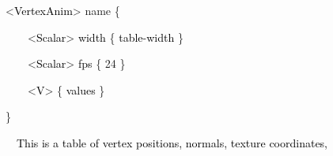 \documentclass[a4paper]{article}
\newcommand\textstyleOOoComputerKeyWord[1]{\textrm{\textcolor[rgb]{0.0,0.0,0.5019608}{#1}}}
\newcommand\textstyleOOoAssemblerSpecialChar[1]{\textrm{\textcolor[rgb]{0.0,0.5019608,0.0}{#1}}}
\newcommand\textstyleOOoAssemblerIdent[1]{\textrm{\textcolor{black}{#1}}}
\newcommand\textstyleOOoAssemblerDirective[1]{\textrm{\textcolor[rgb]{0.0,0.5019608,1.0}{#1}}}
\newcommand\textstyleOOoAssemblerLiteral[1]{\textrm{\textcolor[rgb]{0.49803922,0.0,0.49803922}{#1}}}
\begin{document}
\bigskip


\bigskip


\bigskip

{\color{black}
\textstyleOOoComputerKeyWord{\textcolor{black}{\ \ }}\textstyleOOoAssemblerSpecialChar{{\textless}}\textstyleOOoAssemblerIdent{VertexAnim}\textstyleOOoAssemblerSpecialChar{{\textgreater}}\textstyleOOoComputerKeyWord{\textcolor{black}{
}}\textstyleOOoAssemblerDirective{name}\textstyleOOoComputerKeyWord{\textcolor{black}{
}}\textstyleOOoAssemblerSpecialChar{\{}\textstyleOOoComputerKeyWord{\textcolor{black}{ }}}

{\color{black}
\textstyleOOoComputerKeyWord{\textcolor{black}{\ \ \ \ \ \ }}\textstyleOOoAssemblerSpecialChar{{\textless}}\textstyleOOoAssemblerIdent{Scalar}\textstyleOOoAssemblerSpecialChar{{\textgreater}}\textstyleOOoComputerKeyWord{\textcolor{black}{
}}\textstyleOOoAssemblerIdent{width}\textstyleOOoComputerKeyWord{\textcolor{black}{
}}\textstyleOOoAssemblerSpecialChar{\{}\textstyleOOoComputerKeyWord{\textcolor{black}{
}}\textstyleOOoAssemblerIdent{table}\textstyleOOoAssemblerSpecialChar{{}-}\textstyleOOoAssemblerIdent{width}\textstyleOOoComputerKeyWord{\textcolor{black}{
}}\textstyleOOoAssemblerSpecialChar{\}}}

{\color{black}
\textstyleOOoComputerKeyWord{\textcolor{black}{\ \ \ \ \ \ }}\textstyleOOoAssemblerSpecialChar{{\textless}}\textstyleOOoAssemblerIdent{Scalar}\textstyleOOoAssemblerSpecialChar{{\textgreater}}\textstyleOOoComputerKeyWord{\textcolor{black}{
}}\textstyleOOoAssemblerIdent{fps}\textstyleOOoComputerKeyWord{\textcolor{black}{
}}\textstyleOOoAssemblerSpecialChar{\{}\textstyleOOoComputerKeyWord{\textcolor{black}{
}}\textstyleOOoAssemblerLiteral{24}\textstyleOOoComputerKeyWord{\textcolor{black}{
}}\textstyleOOoAssemblerSpecialChar{\}}}

{\color{black}
\textstyleOOoComputerKeyWord{\textcolor{black}{\ \ \ \ \ \ }}\textstyleOOoAssemblerSpecialChar{{\textless}}\textstyleOOoAssemblerIdent{V}\textstyleOOoAssemblerSpecialChar{{\textgreater}}\textstyleOOoComputerKeyWord{\textcolor{black}{
}}\textstyleOOoAssemblerSpecialChar{\{}\textstyleOOoComputerKeyWord{\textcolor{black}{
}}\textstyleOOoAssemblerIdent{values}\textstyleOOoComputerKeyWord{\textcolor{black}{
}}\textstyleOOoAssemblerSpecialChar{\}}}

{\color{black}
\textstyleOOoComputerKeyWord{\textcolor{black}{\ \ }}\textstyleOOoAssemblerSpecialChar{\}}}


\bigskip

{\color{black}
\textstyleOOoComputerKeyWord{\textcolor{black}{\ \ \ \ This is a table of vertex positions, normals, texture
coordinates,}}}
\end{document}
